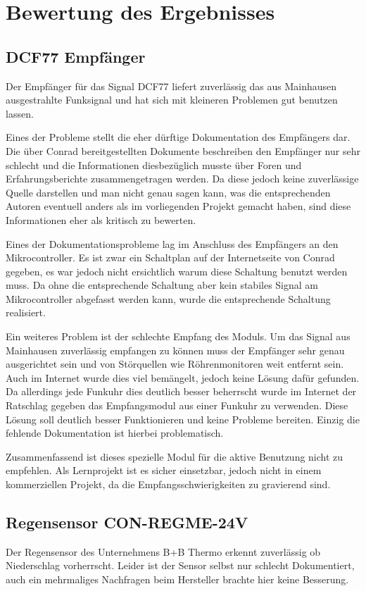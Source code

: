 	\section{Bewertung des Ergebnisses}
		\subsection{DCF77 Empfänger}
			Der Empfänger für das Signal DCF77 liefert zuverlässig das aus Mainhausen ausgestrahlte Funksignal und hat sich mit kleineren Problemen gut benutzen lassen. 
			
			Eines der Probleme stellt die eher dürftige Dokumentation des Empfängers dar. Die über Conrad bereitgestellten Dokumente beschreiben den Empfänger nur sehr schlecht und die Informationen diesbezüglich musste über Foren und Erfahrungsberichte zusammengetragen werden. Da diese jedoch keine zuverlässige Quelle darstellen und man nicht genau sagen kann, was die entsprechenden Autoren eventuell anders als im vorliegenden Projekt gemacht haben, sind diese Informationen eher als kritisch zu bewerten.
			
			Eines der Dokumentationsprobleme lag im Anschluss des Empfängers an den Mikrocontroller. Es ist zwar ein Schaltplan auf der Internetseite von Conrad gegeben, es war jedoch nicht ersichtlich warum diese Schaltung benutzt werden muss. Da ohne die entsprechende Schaltung aber kein stabiles Signal am Mikrocontroller abgefasst werden kann, wurde die entsprechende Schaltung realisiert.
			
			Ein weiteres Problem ist der schlechte Empfang des Moduls. Um das Signal aus Mainhausen zuverlässig empfangen zu können muss der Empfänger sehr genau ausgerichtet sein und von Störquellen wie Röhrenmonitoren weit entfernt sein. Auch im Internet wurde dies viel bemängelt, jedoch keine Lösung dafür gefunden. Da allerdings jede Funkuhr dies deutlich besser beherrscht wurde im Internet der Ratschlag gegeben das Empfangsmodul aus einer Funkuhr zu verwenden. Diese Lösung soll deutlich besser Funktionieren und keine Probleme bereiten. Einzig die fehlende Dokumentation ist hierbei problematisch.
			
			Zusammenfassend ist dieses spezielle Modul für die aktive Benutzung nicht zu empfehlen. Als Lernprojekt ist es sicher einsetzbar, jedoch nicht in einem kommerziellen Projekt, da die Empfangsschwierigkeiten zu gravierend sind.
		\subsection{Regensensor CON-REGME-24V}
			Der Regensensor des Unternehmens B+B Thermo erkennt zuverlässig ob Niederschlag vorherrscht. Leider ist der Sensor selbst nur schlecht Dokumentiert, auch ein mehrmaliges Nachfragen beim Hersteller brachte hier keine Besserung.
			
